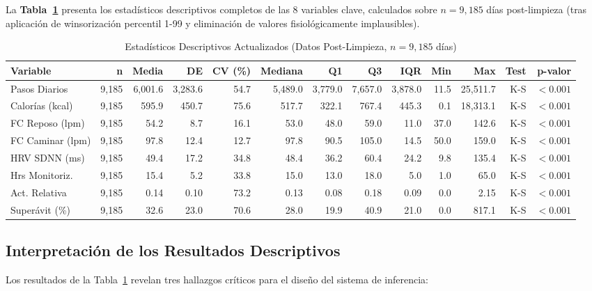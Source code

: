 \documentclass[12pt,letterpaper,twoside]{report}
\begin{document}
La \textbf{Tabla~\ref{tab:descriptive_daily}} presenta los estadísticos descriptivos completos de las 8 variables clave, calculados sobre $n=9,185$ días post-limpieza (tras aplicación de winsorización percentil 1-99 y eliminación de valores fisiológicamente implausibles).

\begin{landscape}
\begin{table}[htbp]
\centering
\caption{Estadísticos Descriptivos Actualizados (Datos Post-Limpieza, $n=9,185$ días)}
\label{tab:descriptive_daily}
\footnotesize
\begin{tabular}{lrrrrrrrrrrrr}
\toprule
\textbf{Variable} & \textbf{n} & \textbf{Media} & \textbf{DE} & \textbf{CV (\%)} & \textbf{Mediana} & \textbf{Q1} & \textbf{Q3} & \textbf{IQR} & \textbf{Min} & \textbf{Max} & \textbf{Test} & \textbf{p-valor} \\
\midrule
Pasos Diarios & 9,185 & 6,001.6 & 3,283.6 & 54.7 & 5,489.0 & 3,779.0 & 7,657.0 & 3,878.0 & 11.5 & 25,511.7 & K-S & $<0.001$ \\
Calorías (kcal) & 9,185 & 595.9 & 450.7 & 75.6 & 517.7 & 322.1 & 767.4 & 445.3 & 0.1 & 18,313.1 & K-S & $<0.001$ \\
FC Reposo (lpm) & 9,185 & 54.2 & 8.7 & 16.1 & 53.0 & 48.0 & 59.0 & 11.0 & 37.0 & 142.6 & K-S & $<0.001$ \\
FC Caminar (lpm) & 9,185 & 97.8 & 12.4 & 12.7 & 97.8 & 90.5 & 105.0 & 14.5 & 50.0 & 159.0 & K-S & $<0.001$ \\
HRV SDNN (ms) & 9,185 & 49.4 & 17.2 & 34.8 & 48.4 & 36.2 & 60.4 & 24.2 & 9.8 & 135.4 & K-S & $<0.001$ \\
Hrs Monitoriz. & 9,185 & 15.4 & 5.2 & 33.8 & 15.0 & 13.0 & 18.0 & 5.0 & 1.0 & 65.0 & K-S & $<0.001$ \\
Act. Relativa & 9,185 & 0.14 & 0.10 & 73.2 & 0.13 & 0.08 & 0.18 & 0.09 & 0.0 & 2.15 & K-S & $<0.001$ \\
Superávit (\%) & 9,185 & 32.6 & 23.0 & 70.6 & 28.0 & 19.9 & 40.9 & 21.0 & 0.0 & 817.1 & K-S & $<0.001$ \\
\bottomrule
\end{tabular}
\end{table}
\end{landscape}

\subsection{Interpretación de los Resultados Descriptivos}

Los resultados de la Tabla~\ref{tab:descriptive_daily} revelan tres hallazgos críticos para el diseño del sistema de inferencia:
\end{document}
